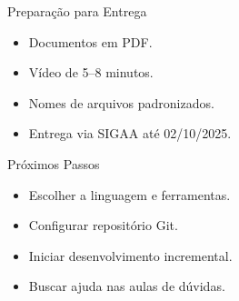 \documentclass[10pt]{beamer}
\begin{document}
\begin{frame}{Preparação para Entrega}
\begin{itemize}
    \item Documentos em PDF.
    \item Vídeo de 5–8 minutos.
    \item Nomes de arquivos padronizados.
    \item Entrega via SIGAA até 02/10/2025.
\end{itemize}
\end{frame}

\begin{frame}{Próximos Passos}
\begin{itemize}
    \item Escolher a linguagem e ferramentas.
    \item Configurar repositório Git.
    \item Iniciar desenvolvimento incremental.
    \item Buscar ajuda nas aulas de dúvidas.
\end{itemize}
\end{frame}
\end{document}

